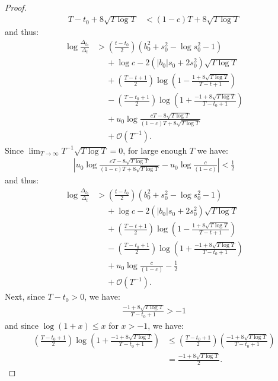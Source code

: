 \begin{proof}
\begin{align*}
    T-t_0 + 8 \sqrt{T\log T} &< (1-c)T + 8 \sqrt{T\log T} 
\end{align*}
and thus:
\begin{align*}
    \log \frac{\Delta_{t_0}}{\Delta_t} &> \left(\frac{t-t_0}{2}\right)(b_0^2 + s_0^2 - \log s_0^2 - 1) \\
    &\quad\: + \log c - 2 (|b_0|s_0 +2s_0^2) \sqrt{T \log T} \\
    &\quad\: + \left(\frac{T - t+1}{2}\right)\log\left(1 - \frac{1 + 8\sqrt{T \log T}}{T-t+1}\right)\\
    &\quad\: - \left(\frac{T - t_0+1}{2}\right)\log\left(1 + \frac{-1 + 8\sqrt{T \log T}}{T-t_0+1}\right)  \\
    &\quad\: + u_0\log \frac{cT - 8\sqrt{T \log T}}{(1-c)T + 8\sqrt{T \log T}} \\
    &\quad\: + \mathcal{O}(T^{-1}).
\end{align*}
Since $\lim_{T\to\infty} T^{-1} \sqrt{T\log T} = 0$, for large enough $T$ we have: 
\begin{align*}
    \left|u_0\log \frac{cT - 8\sqrt{T \log T}}{(1-c)T + 8\sqrt{T \log T}} - u_0\log \frac{c}{(1-c)}\right| < \frac{1}{2}
\end{align*}
and thus:
\begin{align*}
    \log \frac{\Delta_{t_0}}{\Delta_t} &> \left(\frac{t-t_0}{2}\right)(b_0^2 + s_0^2 - \log s_0^2 - 1) \\
    &\quad\: + \log c - 2 (|b_0|s_0 +2s_0^2) \sqrt{T \log T} \\
    &\quad\: + \left(\frac{T - t+1}{2}\right)\log\left(1 - \frac{1 + 8\sqrt{T \log T}}{T-t+1}\right)\\
    &\quad\: - \left(\frac{T - t_0+1}{2}\right)\log\left(1 + \frac{-1 + 8\sqrt{T \log T}}{T-t_0+1}\right)  \\
    &\quad\: + u_0\log \frac{c}{(1-c)} - \frac{1}{2} \\
    &\quad\: + \mathcal{O}(T^{-1}).
\end{align*}
Next, since $T-t_0 > 0$, we have:
\begin{align*}
    \frac{-1 + 8\sqrt{T \log T}}{T-t_0+1} > -1
\end{align*}
and since $\log(1+x) \leq x$ for $x > -1$, we have:
\begin{align*}
    \left(\frac{T - t_0 + 1}{2}\right)\log\left(1 + \frac{-1 + 8\sqrt{T \log T}}{T-t_0+1}\right)  &\leq \left(\frac{T - t_0+1}{2}\right) \left(\frac{-1 + 8\sqrt{T \log T}}{T-t_0+1}\right) \\
    &= \frac{-1 + 8\sqrt{T \log T}}{2}.

\end{align*}
\end{proof}
